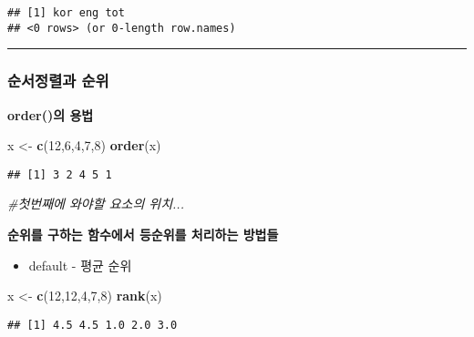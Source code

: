 \documentclass[]{article}
\newenvironment{Shaded}{\begin{snugshade}}{\end{snugshade}}
\newcommand{\KeywordTok}[1]{\textcolor[rgb]{0.13,0.29,0.53}{\textbf{#1}}}
\newcommand{\DecValTok}[1]{\textcolor[rgb]{0.00,0.00,0.81}{#1}}
\newcommand{\StringTok}[1]{\textcolor[rgb]{0.31,0.60,0.02}{#1}}
\newcommand{\CommentTok}[1]{\textcolor[rgb]{0.56,0.35,0.01}{\textit{#1}}}
\newcommand{\NormalTok}[1]{#1}
\providecommand{\tightlist}{%
  \setlength{\itemsep}{0pt}\setlength{\parskip}{0pt}}
\begin{document}
\begin{verbatim}
## [1] kor eng tot
## <0 rows> (or 0-length row.names)
\end{verbatim}

\begin{center}\rule{0.5\linewidth}{\linethickness}\end{center}

\subsubsection{순서정렬과 순위}\label{-}

\textbf{order()의 용법}

\begin{Shaded}
\begin{Highlighting}[]
\NormalTok{x <-}\StringTok{ }\KeywordTok{c}\NormalTok{(}\DecValTok{12}\NormalTok{,}\DecValTok{6}\NormalTok{,}\DecValTok{4}\NormalTok{,}\DecValTok{7}\NormalTok{,}\DecValTok{8}\NormalTok{)}
\KeywordTok{order}\NormalTok{(x)}
\end{Highlighting}
\end{Shaded}

\begin{verbatim}
## [1] 3 2 4 5 1
\end{verbatim}

\begin{Shaded}
\begin{Highlighting}[]
\CommentTok{#첫번째에 와야할 요소의 위치...}
\end{Highlighting}
\end{Shaded}

\textbf{순위를 구하는 함수에서 등순위를 처리하는 방법들}

\begin{itemize}
\tightlist
\item
  default - 평균 순위
\end{itemize}

\begin{Shaded}
\begin{Highlighting}[]
\NormalTok{x <-}\StringTok{ }\KeywordTok{c}\NormalTok{(}\DecValTok{12}\NormalTok{,}\DecValTok{12}\NormalTok{,}\DecValTok{4}\NormalTok{,}\DecValTok{7}\NormalTok{,}\DecValTok{8}\NormalTok{)}
\KeywordTok{rank}\NormalTok{(x)}
\end{Highlighting}
\end{Shaded}

\begin{verbatim}
## [1] 4.5 4.5 1.0 2.0 3.0
\end{verbatim}
\end{document}
